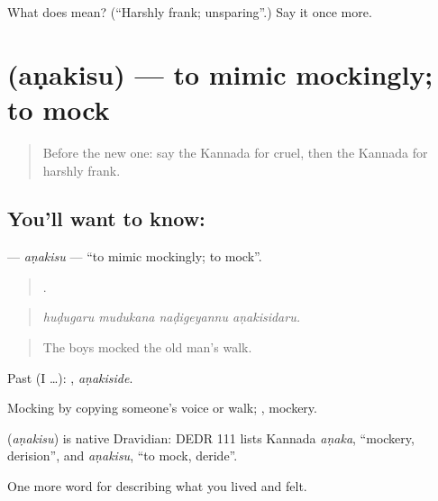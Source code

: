 \begin{tcolorbox}[breakable,colback=teal!4,colframe=teal!35!black,title={Before you move on}]
What does  mean? (\textquotedblleft{}Harshly frank; unsparing\textquotedblright{}.) Say it once more.
\end{tcolorbox}
\section[\texorpdfstring{\kn{ಅಣಕಿಸು} (aṇakisu)}{ಅಣಕಿಸು (aṇakisu)}]{ (aṇakisu) — to mimic mockingly; to mock}

\label{lesson:KA-C501-anakisu}



\begin{quote}
Before the new one: say the Kannada for cruel, then the Kannada for harshly frank.
\end{quote}

\subsection*{You'll want to know: }
\textbf{} — \emph{aṇakisu} — \textquotedblleft{}to mimic mockingly; to mock\textquotedblright{}.

\begin{quote}
   .
\end{quote}

\begin{quote}
\emph{huḍugaru mudukana naḍigeyannu aṇakisidaru.}
\end{quote}

\begin{quote}
The boys mocked the old man's walk.
\end{quote}

Past (I …): , \emph{aṇakiside}.

Mocking by copying someone's voice or walk; , mockery.

\begin{cousinweb}
\textbf{} (\emph{aṇakisu}) is native Dravidian: DEDR 111 lists Kannada \emph{aṇaka}, \textquotedblleft{}mockery, derision\textquotedblright{}, and \emph{aṇakisu}, \textquotedblleft{}to mock, deride\textquotedblright{}.
\end{cousinweb}

\begin{grammarlens}[title={What you've built}]
One more word for describing what you lived and felt.
\end{grammarlens}

